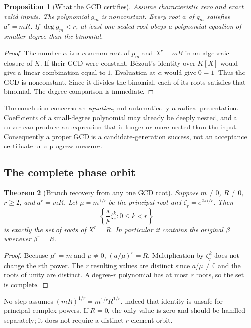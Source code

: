 \documentclass[11pt,letterpaper]{article}
\numberwithin{equation}{section}
\newtheorem{theorem}{Theorem}[section]
\newtheorem{proposition}[theorem]{Proposition}
\theoremstyle{definition}\newtheorem{definition}[theorem]{Definition}
\theoremstyle{remark}\newtheorem{remark}[theorem]{Remark}
\begin{document}
\begin{proposition}[What the GCD certifies]\label{prop:gcd}
Assume characteristic zero and exact valid inputs. The polynomial $g_m$ is nonconstant. Every root $a$ of $g_m$ satisfies $a^r=mR$. If $\deg g_m<r$, at least one scaled root obeys a polynomial equation of smaller degree than the binomial.
\end{proposition}
\begin{proof}
The number $\alpha$ is a common root of $p_m$ and $X^r-mR$ in an algebraic closure of $K$. If their GCD were constant, B\'ezout's identity over $K[X]$ would give a linear combination equal to $1$. Evaluation at $\alpha$ would give $0=1$. Thus the GCD is nonconstant. Since it divides the binomial, each of its roots satisfies that binomial. The degree comparison is immediate.
\end{proof}

The conclusion concerns an \emph{equation}, not automatically a radical presentation. Coefficients of a small-degree polynomial may already be deeply nested, and a solver can produce an expression that is longer or more nested than the input. Consequently a proper GCD is a candidate-generation success, not an acceptance certificate or a progress measure.

\subsection{The complete phase orbit}
\begin{theorem}[Branch recovery from any one GCD root]\label{thm:orbit}
Suppose $m\ne0$, $R\ne0$, $r\ge2$, and $a^r=mR$. Let $\mu=m^{1/r}$ be the principal root and $\zeta_r=e^{2\pi i/r}$. Then
\begin{equation}\label{eq:orbit}
 \left\{\frac{a}{\mu}\zeta_r^k:0\le k<r\right\}
\end{equation}
is exactly the set of roots of $X^r=R$. In particular it contains the original $\beta$ whenever $\beta^r=R$.
\end{theorem}
\begin{proof}
Because $\mu^r=m$ and $\mu\ne0$, $(a/\mu)^r=R$. Multiplication by $\zeta_r^k$ does not change the $r$th power. The $r$ resulting values are distinct since $a/\mu\ne0$ and the roots of unity are distinct. A degree-$r$ polynomial has at most $r$ roots, so the set is complete.
\end{proof}

No step assumes $(mR)^{1/r}=m^{1/r}R^{1/r}$. Indeed that identity is unsafe for principal complex powers. If $R=0$, the only value is zero and should be handled separately; it does not require a distinct $r$-element orbit.
\end{document}
